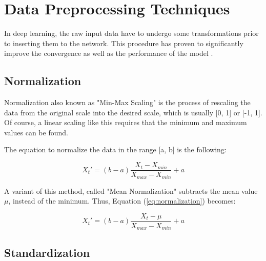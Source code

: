 \documentclass[a4paper, 12pt]{article}
\numberwithin{equation}{section}
\numberwithin{figure}{section}
\numberwithin{table}{section}
\begin{document}
	\newpage
%	
	\section{Data Preprocessing Techniques} \label{data_preprocessing}
	
	In deep learning, the raw input data have to undergo some transformations prior to inserting them to the network. This procedure has proven to significantly improve the convergence as well as the performance of the model \cite{eff_backprop}.
	
	\subsection{Normalization}
	
	Normalization also known as "Min-Max Scaling" is the process of rescaling the data from the original scale into the desired scale, which is usually [0, 1] or [-1, 1]. Of course, a linear scaling like this requires that the minimum and maximum values can be found. \par
	
	\vspace*{0.5cm}
	
	\noindent The equation to normalize the data in the range [a, b] is the following:
	
	\begin{equation} \label{eq:normalization}
		X_t' = (b - a) \frac{X_t - X_{min}}{X_{max} - X_{min}} + a
	\end{equation}
	
	\vspace*{0.5cm}
	
	\noindent A variant of this method, called "Mean Normalization" subtracts the mean value $\mu$, instead of the minimum. Thus, Equation (\ref{eq:normalization}) becomes:
	
	\begin{equation}
		X_t' = (b - a) \frac{X_t - \mu}{X_{max} - X_{min}} + a
	\end{equation}
	
	
	\subsection{Standardization}
	
\end{document}
